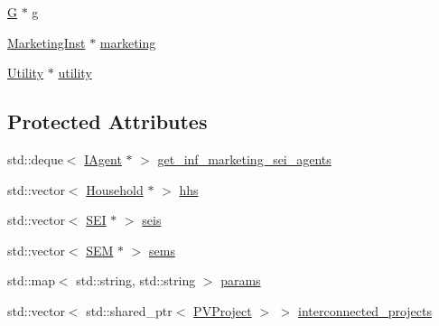 {\bf }\par
\begin{DoxyCompactItemize}
\item 
\hyperlink{classsolar__core_1_1_g}{G} $\ast$ \hyperlink{classsolar__core_1_1_w_a9e50ef0da579cdfc3da22c16a492bc44}{g}
\item 
\hyperlink{classsolar__core_1_1_marketing_inst}{Marketing\+Inst} $\ast$ \hyperlink{classsolar__core_1_1_w_a93f277fb3a9d9e7b1e911c6a494c8ec8}{marketing}
\item 
\hyperlink{classsolar__core_1_1_utility}{Utility} $\ast$ \hyperlink{classsolar__core_1_1_w_a6d6fa51d4bdc40dac8b76aa4967030b5}{utility}
\end{DoxyCompactItemize}

\subsection*{Protected Attributes}
\begin{DoxyCompactItemize}
\item 
std\+::deque$<$ \hyperlink{classsolar__core_1_1_i_agent}{I\+Agent} $\ast$ $>$ \hyperlink{classsolar__core_1_1_w_a81b5469757f203c9619ff69323ac0f77}{get\+\_\+inf\+\_\+marketing\+\_\+sei\+\_\+agents}
\item 
std\+::vector$<$ \hyperlink{classsolar__core_1_1_household}{Household} $\ast$ $>$ \hyperlink{classsolar__core_1_1_w_a17c012ff8b17890ed33923cec6d87be3}{hhs}
\item 
std\+::vector$<$ \hyperlink{classsolar__core_1_1_s_e_i}{S\+E\+I} $\ast$ $>$ \hyperlink{classsolar__core_1_1_w_a311baa30390494ae8e79f26e372e716d}{seis}
\item 
std\+::vector$<$ \hyperlink{classsolar__core_1_1_s_e_m}{S\+E\+M} $\ast$ $>$ \hyperlink{classsolar__core_1_1_w_ab6349cbc751747a05618dad4ebb1b726}{sems}
\item 
std\+::map$<$ std\+::string, std\+::string $>$ \hyperlink{classsolar__core_1_1_w_a0d06bc7242f8b3958986118eb217583f}{params}
\item 
std\+::vector$<$ std\+::shared\+\_\+ptr$<$ \hyperlink{classsolar__core_1_1_p_v_project}{P\+V\+Project} $>$ $>$ \hyperlink{classsolar__core_1_1_w_a1d35d6501eef6d673bd2b28e2c1724c4}{interconnected\+\_\+projects}
\end{DoxyCompactItemize}
